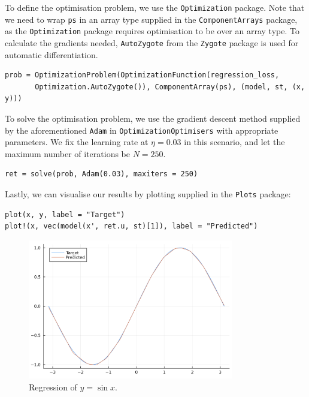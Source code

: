 \documentclass[a4paper,11pt,titlepage]{article}
\theoremstyle{definition}
\theoremstyle{plain}
\theoremstyle{remark}
\begin{document}
To define the optimisation problem, we use the \verb|Optimization| package. Note that we need to wrap \verb|ps| in an array type supplied in the \verb|ComponentArrays| package, as the \verb|Optimization| package requires optimisation to be over an array type. To calculate the gradients needed, \verb|AutoZygote| from the \verb|Zygote| package is used for automatic differentiation.

\begin{verbatim}
prob = OptimizationProblem(OptimizationFunction(regression_loss,
       Optimization.AutoZygote()), ComponentArray(ps), (model, st, (x, y)))
\end{verbatim}

To solve the optimisation problem, we use the gradient descent method supplied by the aforementioned \verb|Adam| in \verb|OptimizationOptimisers| with appropriate parameters. We fix the learning rate at $\eta = 0.03$ in this scenario, and let the maximum number of iterations be $N = 250$.

\begin{verbatim}
ret = solve(prob, Adam(0.03), maxiters = 250)
\end{verbatim}

Lastly, we can visualise our results by plotting supplied in the \verb|Plots| package:

\begin{verbatim}
plot(x, y, label = "Target")
plot!(x, vec(model(x', ret.u, st)[1]), label = "Predicted")
\end{verbatim}

\begin{figure}[htbp]
    \centering
    \includegraphics[width=0.8\textwidth]{figures/Regression.png}
    \caption{Regression of $y = \sin x$.}
    \label{fig:regression}
\end{figure}
\end{document}
